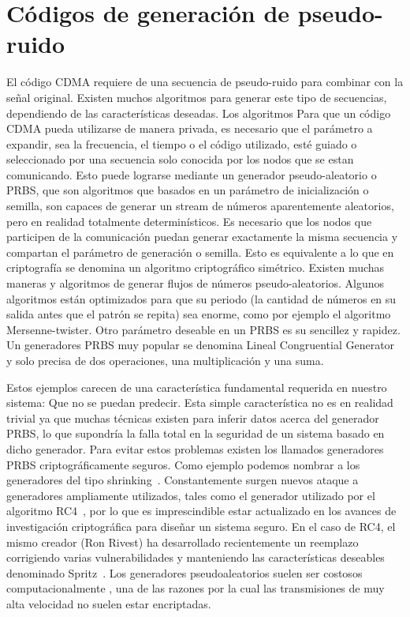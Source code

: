 \section{Códigos de generación de pseudo-ruido}
\label{PRNGs} 
El código CDMA requiere de una secuencia de pseudo-ruido para combinar con la señal original. Existen muchos algoritmos para generar este tipo de secuencias, dependiendo de las características deseadas.
Los algoritmos 
Para que un código CDMA pueda utilizarse de manera privada, es necesario que el parámetro a expandir, sea la frecuencia, el tiempo o el código utilizado, esté guiado o seleccionado por una secuencia solo conocida por los nodos que se estan comunicando. Esto puede lograrse mediante un generador pseudo-aleatorio o PRBS, que son algoritmos que basados en un parámetro de inicialización o semilla, son capaces de generar un stream de números aparentemente aleatorios, pero en realidad totalmente determinísticos. 
Es necesario que los nodos que participen de la comunicación puedan generar exactamente la misma secuencia y compartan el parámetro de generación o semilla. Esto es equivalente a lo que en criptografía se denomina un algoritmo criptográfico simétrico.
Existen muchas maneras y algoritmos de generar flujos de números pseudo-aleatorios. Algunos algoritmos están optimizados para que su periodo (la cantidad de números en su salida antes que el patrón se repita) sea enorme, como por ejemplo el algoritmo Mersenne-twister.
Otro parámetro deseable en un PRBS es su sencillez y rapidez. Un generadores PRBS muy popular se denomina Lineal Congruential Generator y solo precisa de dos operaciones, una multiplicación y una suma.

Estos ejemplos carecen de una característica fundamental requerida en nuestro sistema: Que no se puedan predecir. Esta simple característica no es en realidad trivial ya que muchas técnicas existen para inferir datos acerca del generador PRBS, lo que supondría la falla total en la seguridad de un sistema basado en dicho generador. Para evitar estos problemas existen los llamados generadores PRBS criptográficamente seguros. Como ejemplo podemos nombrar a los generadores del tipo shrinking~\cite{coppersmith1994shrinking}.
Constantemente surgen nuevos ataque a generadores ampliamente utilizados, tales como el generador utilizado por el algoritmo RC4~\cite{vaudenay2007passive}, por lo que es imprescindible estar actualizado en los avances de investigación criptográfica para diseñar un sistema seguro. En el caso de RC4, el mismo creador (Ron Rivest) ha desarrollado recientemente un reemplazo corrigiendo varias vulnerabilidades y manteniendo las características deseables denominado Spritz~\cite{RC14}. Los generadores pseudoaleatorios suelen ser costosos computacionalmente , una de las razones por la cual las transmisiones de muy alta velocidad no suelen estar encriptadas. 

